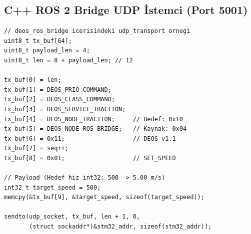 \documentclass[a4paper,10pt]{article}
\begin{document}
\subsection{C++ ROS 2 Bridge UDP İstemci (Port 5001)}
\begin{lstlisting}[style=cstyle]
// deos_ros_bridge icerisindeki udp_transport ornegi
uint8_t tx_buf[64];
uint8_t payload_len = 4;
uint8_t len = 8 + payload_len; // 12

tx_buf[0] = len;
tx_buf[1] = DEOS_PRIO_COMMAND;
tx_buf[2] = DEOS_CLASS_COMMAND;
tx_buf[3] = DEOS_SERVICE_TRACTION;
tx_buf[4] = DEOS_NODE_TRACTION;     // Hedef: 0x10
tx_buf[5] = DEOS_NODE_ROS_BRIDGE;   // Kaynak: 0x04
tx_buf[6] = 0x11;                   // DEOS v1.1
tx_buf[7] = seq++;
tx_buf[8] = 0x01;                   // SET_SPEED

// Payload (Hedef hiz int32: 500 -> 5.00 m/s)
int32_t target_speed = 500;
memcpy(&tx_buf[9], &target_speed, sizeof(target_speed));

sendto(udp_socket, tx_buf, len + 1, 0, 
       (struct sockaddr*)&stm32_addr, sizeof(stm32_addr));
\end{lstlisting}
\end{document}
